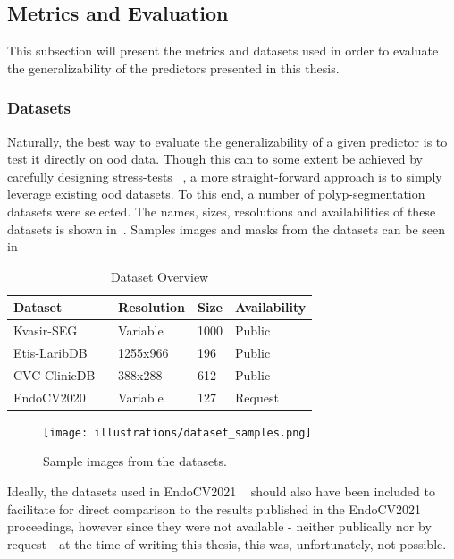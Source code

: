 \subsection{Metrics and Evaluation} \label{metrics}
    This subsection will present the metrics and datasets used in order to evaluate the generalizability of the predictors presented in this thesis.  

    \subsubsection{Datasets} \label{datasets}
    Naturally, the best way to evaluate the generalizability of a given predictor is to test it directly on \gls{ood} data. Though this can to some extent be achieved by carefully designing stress-tests ~\cite{damour2020underspecification}, a more straight-forward approach is to simply leverage existing \gls{ood} datasets. To this end, a number of polyp-segmentation datasets were selected. The names, sizes, resolutions and availabilities of these datasets is shown in~. Samples images and masks from the datasets can be seen in~
    
    \begin{table}[htb]
        \centering
       \begin{tabularx}{\linewidth}{lXXX}
        \toprule
        Dataset & Resolution & Size & Availability \\
        \midrule
        Kvasir-SEG ~\cite{kvasir} & Variable & 1000 & Public \\
        Etis-LaribDB ~\cite{etis-larib} & 1255x966 & 196  & Public \\
        CVC-ClinicDB ~\cite{cvc-clinic} & 388x288 & 612  & Public \\
        EndoCV2020 ~\cite{endocv2020} & Variable & 127  & Request \\
        \bottomrule
    \end{tabularx}
        \caption{Dataset Overview}
        \label{tab:datasets}
    \end{table}
    
    \begin{figure}[htb]
        \centering
        \texttt{[image: illustrations/dataset\_samples.png]}
        \caption{Sample images from the datasets.}
        \label{fig:dataset_examples}
    \end{figure}
    
    Ideally, the datasets used in EndoCV2021 ~\cite{endocv2021} should also have been included to facilitate for direct comparison to the results published in the EndoCV2021 proceedings, however since they were not available - neither publically nor by request - at the time of writing this thesis, this was, unfortunately, not possible. 
    
